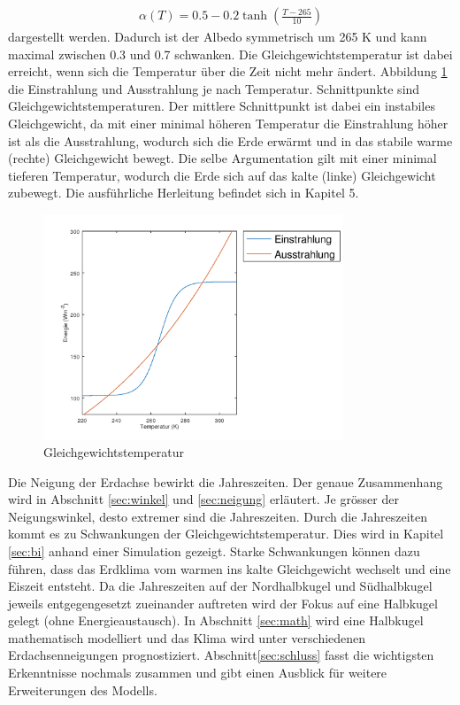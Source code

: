 \begin{refsection}
\begin{eqnarray} 
\alpha(T) = 0.5 - 0.2 \tanh \left( \frac{T-265}{10} \right) 
\end{eqnarray}
dargestellt werden. Dadurch ist der Albedo symmetrisch um 265 K und kann maximal zwischen 0.3 und 0.7 schwanken. Die Gleichgewichtstemperatur ist dabei erreicht, wenn sich die Temperatur über die Zeit nicht mehr ändert. Abbildung \ref{fig:abb1} die Einstrahlung und Ausstrahlung je nach Temperatur. Schnittpunkte sind Gleichgewichtstemperaturen. Der mittlere Schnittpunkt ist dabei ein instabiles Gleichgewicht, da mit einer minimal höheren Temperatur die Einstrahlung höher ist als die Ausstrahlung, wodurch sich die Erde erwärmt und in das stabile warme (rechte) Gleichgewicht bewegt. Die selbe Argumentation gilt mit einer minimal tieferen Temperatur, wodurch die Erde sich auf das kalte (linke) Gleichgewicht zubewegt. Die ausführliche Herleitung befindet sich in Kapitel 5.
%
\begin{figure}
	\centering
	\includegraphics[width= 0.8\textwidth]{Strahlung_1.png}
	\caption[Gleichgewichtstemperatur]{Gleichgewichtstemperatur}
	\label{fig:abb1}
\end{figure}
%
Die Neigung der Erdachse bewirkt die Jahreszeiten. Der genaue Zusammenhang wird in Abschnitt \ref{sec:winkel} und \ref{sec:neigung} erläutert. Je grösser der Neigungswinkel, desto extremer sind die Jahreszeiten. Durch die Jahreszeiten kommt es zu Schwankungen der Gleichgewichtstemperatur. Dies wird in Kapitel \ref{sec:bi} anhand einer Simulation gezeigt. Starke Schwankungen können dazu führen, dass das Erdklima vom warmen ins kalte Gleichgewicht wechselt und eine Eiszeit entsteht. Da die Jahreszeiten auf der Nordhalbkugel und Südhalbkugel jeweils entgegengesetzt zueinander auftreten wird der Fokus auf eine Halbkugel gelegt (ohne Energieaustausch). In Abschnitt \ref{sec:math} wird eine Halbkugel mathematisch modelliert und das Klima wird unter verschiedenen Erdachsenneigungen prognostiziert. Abschnitt\ref{sec:schluss} fasst die wichtigsten Erkenntnisse nochmals zusammen und gibt einen Ausblick für weitere Erweiterungen des Modells.


\end{refsection}

